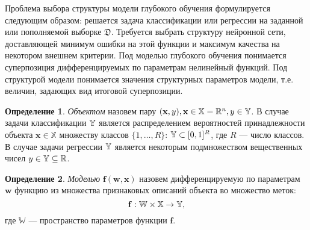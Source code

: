 \documentclass[11pt, a5paper]{dissert}
\theoremstyle{definition}
\newtheorem{defin}{Определение}
\begin{document}
Проблема выбора структуры модели глубокого обучения формулируется следующим образом: решается задача классификации или регрессии на заданной или пополняемой выборке $\mathfrak{D}$. Требуется выбрать структуру нейронной сети, доставляющей минимум ошибки на этой функции и максимум качества на некотором внешнем критерии.
 Под моделью глубокого обучения понимается суперпозиция дифференцируемых по параметрам нелинейный функций. Под структурой модели понимается значения структурных параметров модели, т.е. величин, задающих вид итоговой суперпозиции. 

\begin{defin}
\textit{Объектом} назовем пару $(\mathbf{x}, y), \mathbf{x} \in \mathbb{X} =  \mathbb{R}^n, y \in \mathbb{Y}$. В случае задачи классификации $\mathbb{Y}$ является распределением вероятностей принадлежности объекта $\mathbf{x} \in \mathbb{X}$ множеству классов $\{1, \dots, R\}$: $\mathbb{Y} \subset [0,1]^R$, где $R$ --- число классов. В случае задачи регрессии $\mathbb{Y}$ является некоторым подмножеством вещественных чисел ${y} \in \mathbb{Y}  \subseteq \mathbb{R}$.
\end{defin}



\begin{defin}
\textit{Моделью} $\mathbf{f}(\mathbf{w}, \mathbf{x})$ назовем дифференцируемую по параметрам $\mathbf{w}$ функцию из множества признаковых описаний объекта во множество меток:
\[
    \mathbf{f}:  \mathbb{W}  \times \mathbb{X} \to \mathbb{Y},
\] 
где $\mathbb{W}$ --- пространство параметров функции $\mathbf{f}$.
\end{defin}
\end{document}

